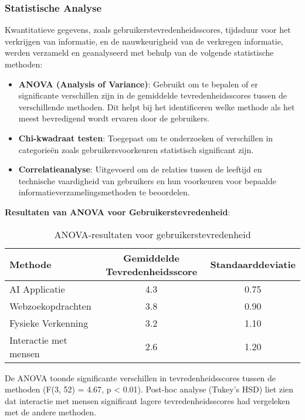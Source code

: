 \subsubsection{Statistische Analyse}
Kwantitatieve gegevens, zoals gebruikerstevredenheidsscores, tijdsduur voor het verkrijgen van informatie, en de nauwkeurigheid van de verkregen informatie, werden verzameld en geanalyseerd met behulp van de volgende statistische methoden:
\begin{itemize}
    \item \textbf{ANOVA (Analysis of Variance)}: Gebruikt om te bepalen of er significante verschillen zijn in de gemiddelde tevredenheidsscores tussen de verschillende methoden. Dit helpt bij het identificeren welke methode als het meest bevredigend wordt ervaren door de gebruikers.
    \item \textbf{Chi-kwadraat testen}: Toegepast om te onderzoeken of verschillen in categorieën zoals gebruikersvoorkeuren statistisch significant zijn.
    \item \textbf{Correlatieanalyse}: Uitgevoerd om de relaties tussen de leeftijd en technische vaardigheid van gebruikers en hun voorkeuren voor bepaalde informatieverzamelingsmethoden te beoordelen.
\end{itemize}

\textbf{Resultaten van ANOVA voor Gebruikerstevredenheid}:
\begin{table}[H]
    \centering
    \begin{tabular}{|l|c|c|}
        \hline
        \textbf{Methode}           & \textbf{Gemiddelde Tevredenheidsscore} & \textbf{Standaarddeviatie} \\ \hline
        AI Applicatie              & 4.3                                   & 0.75                      \\ \hline
        Webzoekopdrachten           & 3.8                                   & 0.90                      \\ \hline
        Fysieke Verkenning          & 3.2                                   & 1.10                      \\ \hline
        Interactie met mensen       & 2.6                                   & 1.20                      \\ \hline
    \end{tabular}
    \caption{ANOVA-resultaten voor gebruikerstevredenheid}
    \label{tab:anova-satisfaction}
\end{table}

De ANOVA toonde significante verschillen in tevredenheidsscores tussen de methoden (F(3, 52) = 4.67, p < 0.01). Post-hoc analyse (Tukey's HSD) liet zien dat interactie met mensen significant lagere tevredenheidsscores had vergeleken met de andere methoden.

